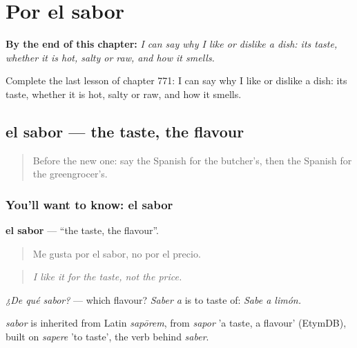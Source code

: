 
\chapter{Por el sabor}
\label{ch:es-por-el-sabor}

\begin{chapteropening}
\textbf{By the end of this chapter:} \emph{I can say why I like or dislike a dish: its taste, whether it is hot, salty or raw, and how it smells.}

Complete the last lesson of chapter 771: I can say why I like or dislike a dish: its taste, whether it is hot, salty or raw, and how it smells.
\end{chapteropening}

\section[el sabor]{el sabor — the taste, the flavour}

\label{lesson:ES-C771-sabor}



\begin{quote}
Before the new one: say the Spanish for the butcher's, then the Spanish for the greengrocer's.
\end{quote}

\subsection*{You'll want to know: el sabor}
\textbf{el sabor} — \textquotedblleft{}the taste, the flavour\textquotedblright{}.

\begin{quote}
Me gusta por el sabor, no por el precio.
\end{quote}

\begin{quote}
\emph{I like it for the taste, not the price.}
\end{quote}

\emph{¿De qué sabor?} — which flavour? \emph{Saber a} is to taste of: \emph{Sabe a limón.}

\begin{cousinweb}
\emph{sabor} is inherited from Latin \emph{sapōrem}, from \emph{sapor} 'a taste, a flavour' (EtymDB), built on \emph{sapere} 'to taste', the verb behind \emph{saber}.
\end{cousinweb}

